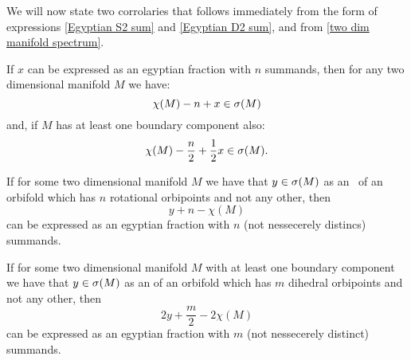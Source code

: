 %

We will now state two corrolaries that follows immediately from the 
form of expressions \ref{Egyptian S2 sum} and \ref{Egyptian D2 sum}, and from 
\ref{two dim manifold spectrum}.
\begin{corollary}\label{from Egyptian fractions}
If $x$ can be expressed as an egyptian fraction with $n$ summands, then for any two dimensional 
manifold $M$ we have: 
\begin{equation}
\chi(M) - n + x \in {{\sigma}(M)}
\end{equation}
and, if $M$ has at least one boundary component also:
\begin{equation}
\chi(M) - \frac{n}{2} + \frac{1}{2}x \in {{\sigma}(M)}.
\end{equation}
\end{corollary}
\begin{corollary}\label{to egyptian fractions}
If for some two dimensional manifold $M$ we have that $y \in {{\sigma}(M)}$ as an \Eoc\ of 
an orbifold which has $n$ rotational orbipoints and not any other, 
then 
\begin{equation}
y + n - \chi(M)
\end{equation} 
can be expressed as an egyptian fraction with $n$ 
(not nessecerely distincs) summands. 

If for some two dimensional manifold $M$ with at least one boundary component 
we have that $y \in {{\sigma}(M)}$ as an \Eoc of an orbifold which has $m$ dihedral orbipoints and 
not any other, 
then 
\begin{equation}
2y + \frac{m}{2} - 2\chi(M)
\end{equation}
can be expressed as an egyptian fraction with $m$ 
(not nessecerely distinct) summands. 
\end{corollary}

